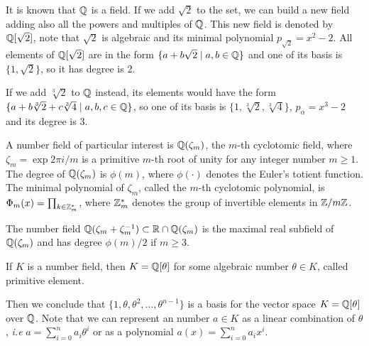 \documentclass[a4paper,12pt]{article}
\begin{document}
\begin{example}
  It is known that $\mathbb{Q}$ is a field. If we add $\sqrt{2}$ to the set, we
  can build a new field adding also all the powers and multiples of
  $\mathbb{Q}$. This new field is denoted by $\mathbb{Q}[\sqrt{2}]$, note that
  $\sqrt{2}$ is algebraic and its minimal polynomial $p_{\sqrt{2}} = x^2-2$. All
  elements of $\mathbb{Q}[\sqrt{2}]$ are in the form $\{a+b\sqrt{2} \;|\; a,b \in
  \mathbb{Q}\}$ and one of its basis is $\{1, \sqrt{2}\}$, so it has degree is
  $2$.
\end{example}

\begin{example}
  If we add $\sqrt[3]{2}$ to $\mathbb{Q}$ instead, its elements would have the
  form $\{a + b\sqrt[3]{2} + c\sqrt[3]{4} \;|\; a,b,c \in \mathbb{Q}\}$, so one of
  its basis is $\{1 ,\sqrt[3]{2} ,\sqrt[3]{4}\}$, $p_\alpha = x^3 - 2$ and its degree
  is $3$.
\end{example}

\begin{example}
  A number field of particular interest is $\mathbb{Q}(\zeta_m)$, the $m$-th cyclotomic field,
  where $\zeta_m = \exp{2\pi i /m}$ is a primitive $m$-th root of unity for any
  integer number $m \geq 1$. The degree of $\mathbb{Q}(\zeta_m)$ is $\phi(m)$, where $\phi(\cdot)$
  denotes the Euler’s totient function. The minimal polynomial of $\zeta_m$, called
  the $m$-th cyclotomic polynomial, is $\Phi_m(x) = \prod_{k \in \mathbb{Z}_{m}^*}$, where $\mathbb{Z}^*_m$ denotes the group of invertible elements in $\mathbb{Z}/m\mathbb{Z}$.
\end{example}

\begin{example}
  \label{ex:maximum-real-subfield}
  The number field $\mathbb{Q}(\zeta_m + \zeta_m^{-1}) \subset \mathbb{R} \cap \mathbb{Q}(\zeta_m)$ is the maximal real subfield of $\mathbb{Q}(\zeta_m)$ and has degree $\phi(m)/2$ if $m \geq 3$.
\end{example}

\begin{theorem}
   If $K$ is a number field, then $K = \mathbb{Q}[\theta]$ for some
  algebraic number $\theta \in K$, called primitive element.
\end{theorem}

Then we conclude that \(\{1, \theta, \theta^2, ... , \theta^{n-1}\}\) is a basis for the vector
space \(K = \mathbb{Q}[\theta]\) over \(\mathbb{Q}\). Note that we can represent an number \(a \in K\) as a linear combination of \(\theta\), \emph{i.e} \(a = \sum^n_{i=0}{a_i\theta^i}\) or as a polynomial \(a(x) = \sum^n_{i=0}{a_ix^i}\).
\end{document}
